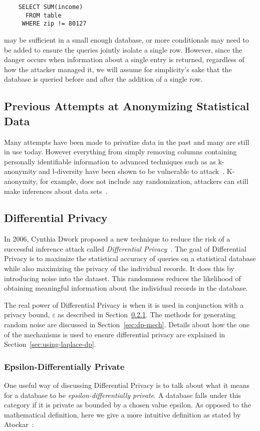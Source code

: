 \documentclass[conference,11pt]{IEEEtran}
\begin{document}
\begin{verbatim}
    SELECT SUM(income)
      FROM table
     WHERE zip != 80127
\end{verbatim}
may be sufficient in a small enough database, or more conditionals may need to
be added to ensure the queries jointly isolate a single row. However, since the
danger occurs when information about a single entry is returned, regardless of
how the attacker managed it, we will assume for simplicity's sake that the
database is queried before and after the addition of a single row.

\subsection{Previous Attempts at Anonymizing Statistical Data}
Many attempts have been made to privatize data in the past and many are still in
use today. However everything from simply removing columns containing personally
identifiable information to advanced techniques such as as k-anonymity and
l-diversity have been shown to be vulnerable to attack~\cite{Atockar:2014}.
K-anonymity, for example, does not include any randomization, attackers can
still make inferences about data sets~\cite{Aggarwal:2005}.

\subsection{Differential Privacy}
In 2006, Cynthia Dwork proposed a new technique to reduce the risk of a
successful inference attack called \textit{Differential
    Privacy}~\cite{Hilton:DP:history}. The goal of Differential Privacy is to
maximize the statistical accuracy of queries on a statistical database while
also maximizing the privacy of the individual records. It does this by
introducing noise into the dataset. This randomness reduces the likelihood of
obtaining meaningful information about the individual records in the database.

The real power of Differential Privacy is when it is used in conjunction with a
privacy bound, $\varepsilon$ as described in Section~\ref{sec:epsilon-dp}. The
methods for generating random noise are discussed in Section~\ref{sec:dp-mech}.
Details about how the one of the mechanisms is used to ensure differential
privacy are explained in Section~\ref{sec:using-laplace-dp}.

\subsubsection{Epsilon-Differentially Private}\label{sec:epsilon-dp}
One useful way of discussing Differential Privacy is to talk about what it means
for a database to be \textit{epsilon-differentially private}. A database falls
under this category if it is private as bounded by a chosen value epsilon. As
opposed to the mathematical definition, here we give a more intuitive definition
as stated by Atockar~\cite{Atockar:2014}:
\end{document}
